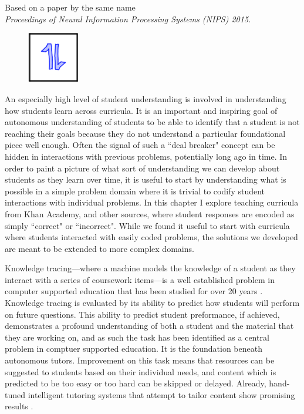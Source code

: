 Based on a paper by the same name \cite{piech2015deep}\\ \emph{Proceedings of Neural Information Processing Systems (NIPS) 2015.}

\vspace{7mm}

\begin{figure}[h!]
\includegraphics[width=0.2\textwidth]{img/assnType_1}
\end{figure}

\vspace{7mm}

An especially high level of student understanding is involved in understanding how students learn across curricula. It is an important and inspiring goal of autonomous understanding of students to be able to identify that a student is not reaching their goals because they do not understand a particular foundational piece well enough. Often the signal of such a ``deal breaker" concept can be hidden in interactions with previous problems, potentially long ago in time.
In order to paint a picture of what sort of understanding we can develop about students as they learn over time, it is useful to start by understanding what is possible in a simple problem domain where it is trivial to codify student interactions with individual problems. In this chapter I explore teaching curricula from Khan Academy, and other sources, where student responses are encoded as simply ``correct" or ``incorrect". While we found it useful to start with curricula where students interacted with easily coded problems, the solutions we developed are meant to be extended to more complex domains.

Knowledge tracing---where a machine models the knowledge of a student as they interact with a series of coursework items---is a well established problem in computer supported education that has been studied for over 20 years \cite{corbett1994knowledge}. Knowledge tracing is evaluated by its ability to predict how students will perform on future questions. This ability to predict student preformance, if achieved, demonstrates a profound understanding of both a student and the material that they are working on, and as such the task has been identified as a central problem in comptuer supported education. It is the foundation beneath autonomous tutors. Improvement on this task means that resources can be suggested to students based on their individual needs, and content which is predicted to be too easy or too hard
can be skipped or delayed. Already, hand-tuned intelligent tutoring systems that attempt to tailor content show promising results \cite{polson2013foundations}. %

